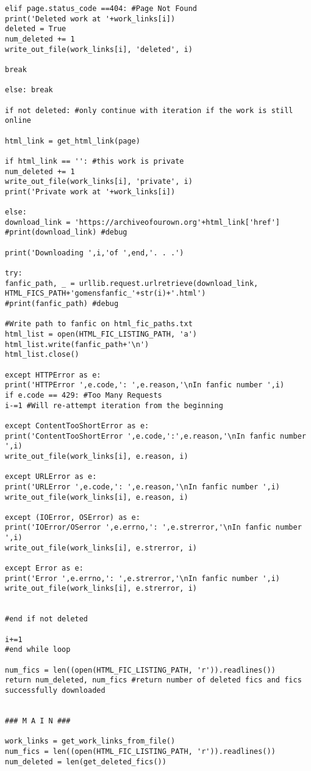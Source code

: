 \documentclass{pre-tfg}
\begin{document}
\begin{lstlisting}[style=consola]
elif page.status_code ==404: #Page Not Found
print('Deleted work at '+work_links[i])
deleted = True
num_deleted += 1
write_out_file(work_links[i], 'deleted', i)

break

else: break

if not deleted: #only continue with iteration if the work is still online

html_link = get_html_link(page)

if html_link == '': #this work is private
num_deleted += 1
write_out_file(work_links[i], 'private', i)
print('Private work at '+work_links[i])

else:
download_link = 'https://archiveofourown.org'+html_link['href']
#print(download_link) #debug

print('Downloading ',i,'of ',end,'. . .')

try:
fanfic_path, _ = urllib.request.urlretrieve(download_link, HTML_FICS_PATH+'gomensfanfic_'+str(i)+'.html')
#print(fanfic_path) #debug

#Write path to fanfic on html_fic_paths.txt
html_list = open(HTML_FIC_LISTING_PATH, 'a')
html_list.write(fanfic_path+'\n')
html_list.close()

except HTTPError as e:
print('HTTPError ',e.code,': ',e.reason,'\nIn fanfic number ',i)
if e.code == 429: #Too Many Requests
i-=1 #Will re-attempt iteration from the beginning

except ContentTooShortError as e:
print('ContentTooShortError ',e.code,':',e.reason,'\nIn fanfic number ',i)
write_out_file(work_links[i], e.reason, i)

except URLError as e:
print('URLError ',e.code,': ',e.reason,'\nIn fanfic number ',i)
write_out_file(work_links[i], e.reason, i)

except (IOError, OSError) as e:
print('IOError/OSerror ',e.errno,': ',e.strerror,'\nIn fanfic number ',i)
write_out_file(work_links[i], e.strerror, i)

except Error as e:
print('Error ',e.errno,': ',e.strerror,'\nIn fanfic number ',i)
write_out_file(work_links[i], e.strerror, i)


#end if not deleted

i+=1
#end while loop

num_fics = len((open(HTML_FIC_LISTING_PATH, 'r')).readlines())
return num_deleted, num_fics #return number of deleted fics and fics successfully downloaded


### M A I N ###

work_links = get_work_links_from_file()
num_fics = len((open(HTML_FIC_LISTING_PATH, 'r')).readlines())
num_deleted = len(get_deleted_fics())


\end{lstlisting}
\end{document}
